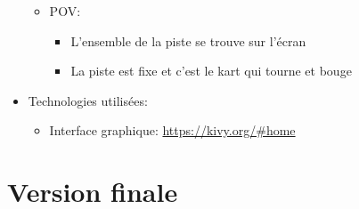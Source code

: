 \documentclass{article}
\begin{document}
\begin{itemize}
\begin{itemize}
              \item POV: \begin{itemize}
                        \item L'ensemble de la piste se trouve sur l'écran
                        \item La piste est fixe et c'est le kart qui tourne et bouge
                    \end{itemize}
          \end{itemize}
    \item Technologies utilisées: \begin{itemize}
              \item Interface graphique: \url{https://kivy.org/#home}
          \end{itemize}
\end{itemize}

\section{Version finale}
\end{document}
